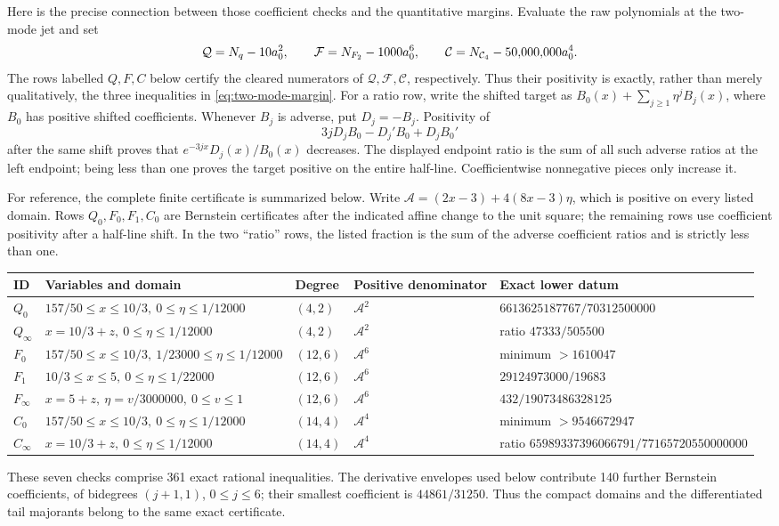 Here is the precise connection between those coefficient checks and the
quantitative margins. Evaluate the raw polynomials at the two-mode jet and set
\[
 \mathcal Q=N_q-10a_0^2,
 \qquad \mathcal F=N_{F_2}-1000a_0^6,
 \qquad \mathcal C=N_{\mathcal{C}_4}-50{,}000{,}000a_0^4.
\]
The rows labelled \(Q,F,C\) below certify the cleared numerators of
\(\mathcal Q,\mathcal F,\mathcal C\), respectively. Thus their positivity is
exactly, rather than merely qualitatively, the three inequalities in
\eqref{eq:two-mode-margin}. For a ratio row, write the shifted target as
\(B_0(x)+\sum_{j\geq1}\eta^jB_j(x)\), where \(B_0\) has positive shifted
coefficients. Whenever \(B_j\) is adverse, put \(D_j=-B_j\). Positivity of
\[
 3jD_jB_0-D_j'B_0+D_jB_0'
\]
after the same shift proves that
\(e^{-3jx}D_j(x)/B_0(x)\) decreases. The displayed endpoint ratio is the sum
of all such adverse ratios at the left endpoint; being less than one proves
the target positive on the entire half-line. Coefficientwise nonnegative
pieces only increase it.

For reference, the complete finite certificate is summarized below.  Write
\(\mathcal A=(2x-3)+4(8x-3)\eta\), which is positive on every listed domain.
Rows \(Q_0,F_0,F_1,C_0\) are Bernstein certificates after the indicated
affine change to the unit square; the remaining rows use coefficient
positivity after a half-line shift. In the two ``ratio'' rows, the listed
fraction is the sum of
the adverse coefficient ratios and is strictly less than one.
\begin{center}
\tiny
\begin{tabular}{@{}lllll@{}}
\toprule
ID & Variables and domain & Degree & Positive denominator & Exact lower datum \\
\midrule
\(Q_0\) & \(157/50\le x\le10/3,\ 0\le \eta\le1/12000\)
 & \((4,2)\) & \(\mathcal A^2\) & \(6613625187767/70312500000\) \\
\(Q_\infty\) & \(x=10/3+z,\ 0\le \eta\le1/12000\)
 & \((4,2)\) & \(\mathcal A^2\) & ratio \(47333/505500\) \\
\(F_0\) & \(157/50\le x\le10/3,\ 1/23000\le \eta\le1/12000\)
 & \((12,6)\) & \(\mathcal A^6\) & minimum \(>1610047\) \\
\(F_1\) & \(10/3\le x\le5,\ 0\le \eta\le1/22000\)
 & \((12,6)\) & \(\mathcal A^6\) & \(29124973000/19683\) \\
\(F_\infty\) & \(x=5+z,\ \eta=v/3000000,\ 0\leq v\leq1\)
 & \((12,6)\) & \(\mathcal A^6\) & \(432/19073486328125\) \\
\(C_0\) & \(157/50\le x\le10/3,\ 0\le \eta\le1/12000\)
 & \((14,4)\) & \(\mathcal A^4\) & minimum \(>9546672947\) \\
\(C_\infty\) & \(x=10/3+z,\ 0\le \eta\le1/12000\)
 & \((14,4)\) & \(\mathcal A^4\) & ratio \(65989337396066791/77165720550000000\) \\
\bottomrule
\end{tabular}
\end{center}
These seven checks comprise 361 exact rational inequalities.  The derivative
envelopes used below contribute 140 further Bernstein coefficients, of
bidegrees \((j+1,1)\), \(0\le j\le6\); their smallest coefficient is
\(44861/31250\).  Thus the compact domains and the differentiated tail
majorants belong to the same exact certificate.

